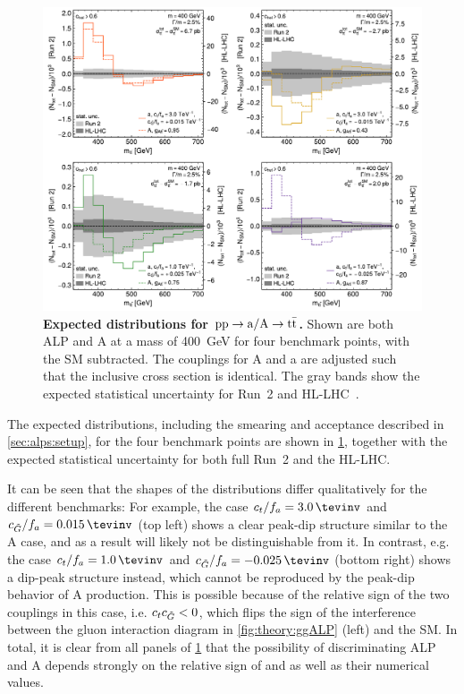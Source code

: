 \begin{figure}[t]
    \centering
    \includegraphics[width=0.99\linewidth]{figures/alps/mttplots.pdf}
    \caption{\textbf{Expected \mtt distributions for $\mathrm{pp \rightarrow a/A \rightarrow \mathrm{t \bar{t}}}$.} Shown are both ALP and A at a mass of \SI{400}{\GeV} for four benchmark points, with the SM subtracted. The couplings for A and a are adjusted such that the inclusive cross section is identical. The gray bands show the expected statistical uncertainty for Run~2 and HL-LHC~\cite{Jeppe:2024sxt}.
    }
    \label{fig:alps:mttplots}
\end{figure}

The expected \mtt distributions, including the smearing and acceptance described in \cref{sec:alps:setup}, for the four benchmark points are shown in \cref{fig:alps:mttplots}, together with the expected statistical uncertainty for both full Run~2 and the HL-LHC. 

It can be seen that the shapes of the distributions differ qualitatively for the different benchmarks: For example, the case $\ct/f_a = \SI{3.0}{\tevinv}$ and $\cG/f_a = \SI{+0.015}{\tevinv}$ (top left) shows a clear peak-dip structure similar to the A case, and as a result will likely not be distinguishable from it. In contrast, e.g. the case $\ct/f_a = \SI{1.0}{\tevinv}$ and $\cG/f_a = \SI{-0.025}{\tevinv}$ (bottom right) shows a dip-peak structure instead, which cannot be reproduced by the peak-dip behavior of A production. This is possible because of the relative sign of the two couplings in this case, i.e. $c_t c_{\tilde{G}} < 0$, which flips the sign of the interference between the gluon interaction diagram in \cref{fig:theory:ggALP} (left) and the SM.
In total, it is clear from all panels of \cref{fig:alps:mttplots} that the possibility of discriminating ALP and A depends strongly on the relative sign of \ct and \cG as well as their numerical values.

